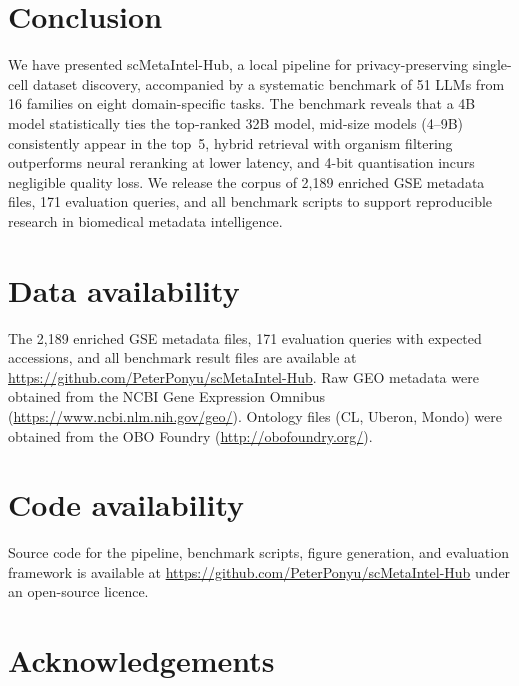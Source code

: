 \documentclass[sn-nature]{sn-jnl}
\begin{document}
\section{Conclusion}\label{sec:conclusion}

We have presented scMetaIntel-Hub, a local pipeline for privacy-preserving
single-cell dataset discovery, accompanied by a systematic benchmark of 51
LLMs from 16 families on eight domain-specific tasks. The benchmark reveals
that a 4B model statistically ties the top-ranked 32B model, mid-size
models (4--9B) consistently appear in the top~5, hybrid retrieval with
organism filtering outperforms neural reranking at lower latency, and
4-bit quantisation incurs negligible quality loss. We release the corpus of 2{,}189 enriched
GSE metadata files, 171 evaluation queries, and all benchmark scripts to
support reproducible research in biomedical metadata intelligence.

\backmatter

\section*{Data availability}

The 2{,}189 enriched GSE metadata files, 171 evaluation queries with
expected accessions, and all benchmark result files are available at
\url{https://github.com/PeterPonyu/scMetaIntel-Hub}. Raw GEO metadata
were obtained from the NCBI Gene Expression Omnibus
(\url{https://www.ncbi.nlm.nih.gov/geo/}). Ontology files (CL, Uberon,
Mondo) were obtained from the OBO Foundry (\url{http://obofoundry.org/}).

\section*{Code availability}

Source code for the pipeline, benchmark scripts, figure generation, and
evaluation framework is available at
\url{https://github.com/PeterPonyu/scMetaIntel-Hub} under an open-source
licence.

\section*{Acknowledgements}
\end{document}
